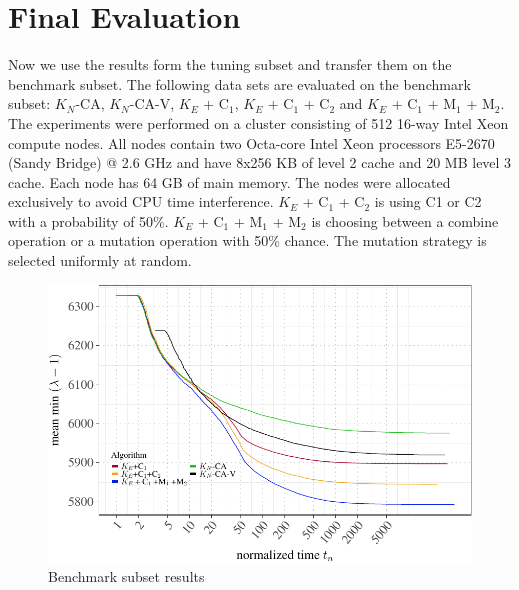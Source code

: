 \documentclass[a4paper,12pt,titlepage, BCOR7mm,headsepline]{scrbook}
\numberwithin{equation}{section}
\begin{document}
\section{Final Evaluation}
Now we use the results form the tuning subset and transfer them on the benchmark subset. The following data sets are evaluated on the benchmark subset: $K_N$-CA, $K_N$-CA-V, $K_E$ + C$_1$, $K_E$ + C$_1$ + C$_2$ and $K_E$ + C$_1$ + M$_1$ + M$_2$. The experiments were performed on a cluster consisting of 512 16-way Intel Xeon compute nodes. All nodes contain two Octa-core Intel Xeon processors E5-2670 (Sandy Bridge) @ 2.6 GHz and have 8x256 KB of level 2 cache and 20 MB level 3 cache. Each node has 64 GB of main memory. The nodes were allocated exclusively to avoid CPU time interference. $K_E$ + C$_1$ + C$_2$ is using C1 or C2 with a probability of 50\%. $K_E$ + C$_1$ + M$_1$ + M$_2$ is choosing between a combine operation or a mutation operation with 50\% chance. The mutation strategy is selected uniformly at random.
\begin{figure}[H]

\begin{center}
\includegraphics[width=\textwidth]{rnw/tuning_subset_plots/full_plot-1}\caption{Benchmark subset results}

\end{center}

\end{figure}
\end{document}
